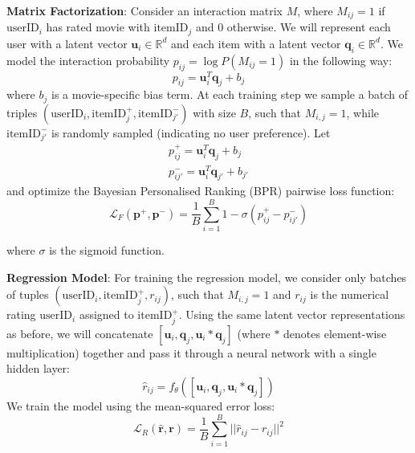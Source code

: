 \documentclass[12pt]{article}
\begin{document}
\noindent\textbf{Matrix Factorization}: 
\label{sec:matrix_fac}
Consider an interaction matrix $M$, where $M_{ij} = 1$ if $\text{userID}_i$ has rated movie with $\text{itemID}_j$ and $0$ otherwise. We will represent each user with a latent vector $\mathbf{u}_i\in\mathbb{R}^d$ and each item with a latent vector $\mathbf{q}_i\in\mathbb{R}^d$. We model the interaction probability $p_{ij}=\log P(M_{ij}=1)$ in the following way:
\begin{equation}
    p_{ij} = \mathbf{u}_i^T\mathbf{q}_j + b_j
    \label{eq:prob}
\end{equation}
where $b_j$ is a movie-specific bias term. At each training step we sample a batch of triples $(\text{userID}_i, \text{itemID}_j^+, \text{itemID}_{j'}^-)$ with size $B$, such that $M_{i, j} = 1$, while $\text{itemID}_{j'}^-$ is randomly sampled (indicating no user preference). Let
\begin{equation} 
\begin{split}
p^+_{ij} =  \mathbf{u}_i^T\mathbf{q}_j + b_j \\
p^-_{ij'} =  \mathbf{u}_i^T\mathbf{q}_{j'} + b_{j'}
\end{split}
\label{eq:p}
\end{equation}
and optimize the  Bayesian Personalised Ranking (BPR) \cite{Rendle2009BPR} pairwise loss function:
\begin{equation}
    \mathcal{L}_F(\mathbf{p}^+, \mathbf{p}^-)=\frac{1}{B}\sum_{i=1}^B 1-\sigma(p_{ij}^+-p_{ij'}^-)
    \label{eq:l1}
\end{equation}

\noindent where $\sigma$ is the sigmoid function.

\vspace{0.2cm}

\noindent\textbf{Regression Model}: For training the regression model, we consider only batches of tuples $(\text{userID}_i, \text{itemID}_j^+, r_{ij})$, such that $M_{i, j} = 1$ and $r_{ij}$ is the numerical rating $\text{userID}_i$ assigned to $\text{itemID}_j^+$. Using the same latent vector representations as before, we will concatenate $[\mathbf{u}_i, \mathbf{q}_j, \mathbf{u}_i * \mathbf{q}_j]$ (where $*$ denotes element-wise multiplication) together and pass it through a neural network with a single hidden layer:
\begin{equation}
    \hat{r}_{ij}=f_{\theta}([\mathbf{u}_i, \mathbf{q}_j, \mathbf{u}_i * \mathbf{q}_j])
    \label{eq:reg}
\end{equation}
We train the model using the mean-squared error loss:
    \begin{equation}
       \mathcal{L}_R(\mathbf{\hat{r}}, \mathbf{r})= \frac{1}{B}\sum_{i=1}^B ||\hat{r}_{ij}-r_{ij}||^2
     \label{eq:r}
    \end{equation}
\end{document}
